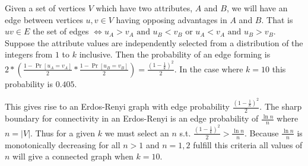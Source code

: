 \documentclass{article}
\begin{document}
Given a set of vertices $V$ which have two attributes, $A$ and $B$, we will have an edge between vertices $u, v \in V$ having opposing advantages in $A$ and $B$.
That is $uv \in E$ the set of edges $\iff u_A > v_A \text{ and } u_B < v_B$
or $u_A < v_A \text{ and } u_B > v_B$.
Suppose the attribute values are independently selected from a distribution of the integers from $1$ to $k$ inclusive.
Then the probability of an edge forming is $2 * (\frac{1 - \Pr[u_A = v_A]}{2} * \frac{1 - \Pr[u_B = v_B]}{2}) = \frac{(1 - \frac1k)^2}{2}$.
In the case where $k = 10$ this probability is $0.405$.

This gives rise to an Erdos-Renyi graph with edge probability $\frac{(1 - \frac1k)^2}{2}$.
The sharp boundary for connectivity in an Erdos-Renyi is an edge probability of $\frac{\ln n}{n}$ where $n = |V|$.
Thus for a given $k$ we must select an $n$ s.t. $\frac{(1 - \frac1k)^2}{2} > \frac{\ln n}{n}$.
Because $\frac{\ln n}{n}$ is monotonically decreasing for all $n > 1$ and $n = 1, 2$ fulfill this criteria all values of $n$ will give a connected graph when $k = 10$.
\end{document}
